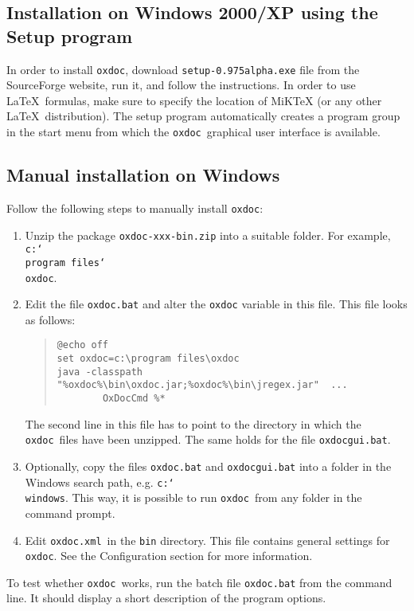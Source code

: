 \documentclass[11pt]{article}
\newcommand\oxdoc{{\tt oxdoc}}
\newcommand\oxdocxml{{\tt oxdoc.xml}}
\newcommand\bs{{\tt\char`\\}}
\begin{document}
\subsection{Installation on Windows 2000/XP using the Setup program}
In order to install \oxdoc, download {\tt setup-0.975alpha.exe} file from
the SourceForge website, run it, and follow the instructions.  
In order to use \LaTeX~formulas, make sure to specify the location of MiKTeX
(or any other \LaTeX~distribution).
The setup program automatically creates a program group in the start menu from
which the \oxdoc~graphical user interface is available. 

\subsection{Manual installation on Windows}
Follow the following steps to manually install \oxdoc:
\begin{enumerate}
\item Unzip the package {\tt oxdoc-xxx-bin.zip} into a
suitable folder. For example, {\tt c:\bs program files\bs oxdoc}.
\item Edit the file
{\tt oxdoc.bat} and alter the {\tt oxdoc} variable in this file. This file looks
as follows:

\begin{quote}
\small \begin{verbatim}
@echo off
set oxdoc=c:\program files\oxdoc
java -classpath "%oxdoc%\bin\oxdoc.jar;%oxdoc%\bin\jregex.jar"  ...
        OxDocCmd %*
\end{verbatim}
\end{quote}

The second line in this file has to point to the directory in which the \oxdoc~files
have been unzipped. The same holds for the file {\tt oxdocgui.bat}. 

\item Optionally, copy the files {\tt oxdoc.bat} and {\tt oxdocgui.bat} into a
folder in the Windows search path, e.g. {\tt c:\bs windows}. This way, it is possible to
run \oxdoc~from any folder in the command prompt. 

\item Edit \oxdocxml~in the {\tt bin} directory. This file contains general settings for \oxdoc.
See the Configuration section for more information.
\end{enumerate}

To test whether \oxdoc~works, run the batch file {\tt oxdoc.bat} from the command line.  It should 
display a short description of the program options.
\end{document}
